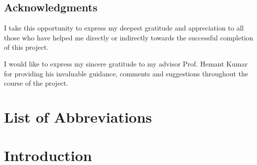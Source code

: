 \documentclass[letterpaper,11pt]{report}
\begin{document}
\newpage
\section*{Acknowledgments}\label{section:acknowledgments}
\pagestyle{plain}
I take this opportunity to express my deepest gratitude and appreciation to all those who have helped me directly or indirectly towards the successful completion of this project.
\par
I would like to express my sincere gratitude to my advisor Prof. Hemant Kumar for providing his invaluable guidance, comments and suggestions throughout the course of the project.

\newpage
\tableofcontents

\listoffigures
{}

\newpage
{}
\chapter*{List of Abbreviations}
\printacronyms[include-classes=abbrev, heading=none]

\newpage
\chapter{Introduction}\label{chapter:introduction}
\setcounter{page}{1}
\onehalfspacing
\end{document}
